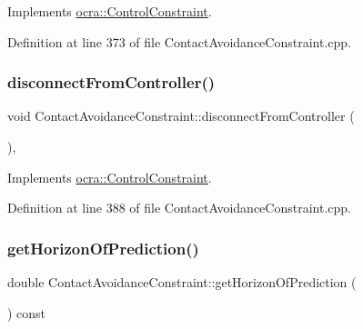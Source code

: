 Implements \hyperlink{classocra_1_1ControlConstraint_a04dabdc1c469146e7b3240dfe0a5172c}{ocra\+::\+Control\+Constraint}.



Definition at line 373 of file Contact\+Avoidance\+Constraint.\+cpp.

\hypertarget{classocra_1_1ContactAvoidanceConstraint_a884358568ff7f5510d26ff96915a4d8c}{}\label{classocra_1_1ContactAvoidanceConstraint_a884358568ff7f5510d26ff96915a4d8c} 
\subsubsection{\texorpdfstring{disconnect\+From\+Controller()}{disconnectFromController()}}
{\footnotesize\ttfamily void Contact\+Avoidance\+Constraint\+::disconnect\+From\+Controller (\begin{DoxyParamCaption}{ }\end{DoxyParamCaption})\hspace{0.3cm}{\ttfamily [protected]}, {\ttfamily [virtual]}}



Implements \hyperlink{classocra_1_1ControlConstraint_adbd15b36773c775a06a0b7bde46ec799}{ocra\+::\+Control\+Constraint}.



Definition at line 388 of file Contact\+Avoidance\+Constraint.\+cpp.

\hypertarget{classocra_1_1ContactAvoidanceConstraint_a1282e8f163c4b53da93b435cdd16501f}{}\label{classocra_1_1ContactAvoidanceConstraint_a1282e8f163c4b53da93b435cdd16501f} 
\subsubsection{\texorpdfstring{get\+Horizon\+Of\+Prediction()}{getHorizonOfPrediction()}}
{\footnotesize\ttfamily double Contact\+Avoidance\+Constraint\+::get\+Horizon\+Of\+Prediction (\begin{DoxyParamCaption}{ }\end{DoxyParamCaption}) const}



